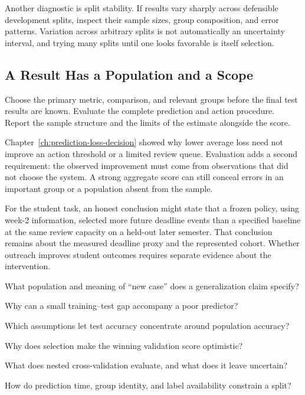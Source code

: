 Another diagnostic is split stability. If results vary sharply across defensible development splits, inspect their sample sizes, group composition, and error patterns. Variation across arbitrary splits is not automatically an uncertainty interval, and trying many splits until one looks favorable is itself selection.

\subsection{A Result Has a Population and a Scope}

Choose the primary metric, comparison, and relevant groups before the final test results are known. Evaluate the complete prediction and action procedure. Report the sample structure and the limits of the estimate alongside the score.

Chapter~\ref{ch:prediction-loss-decision} showed why lower average loss need not improve an action threshold or a limited review queue. Evaluation adds a second requirement: the observed improvement must come from observations that did not choose the system. A strong aggregate score can still conceal errors in an important group or a population absent from the sample.

For the student task, an honest conclusion might state that a frozen policy, using week-2 information, selected more future deadline events than a specified baseline at the same review capacity on a held-out later semester. That conclusion remains about the measured deadline proxy and the represented cohort. Whether outreach improves student outcomes requires separate evidence about the intervention.

\begin{studyquestions}
\item What population and meaning of ``new case'' does a generalization claim specify?
\item Why can a small training--test gap accompany a poor predictor?
\item Which assumptions let test accuracy concentrate around population accuracy?
\item Why does selection make the winning validation score optimistic?
\item What does nested cross-validation evaluate, and what does it leave uncertain?
\item How do prediction time, group identity, and label availability constrain a split?
\end{studyquestions}

